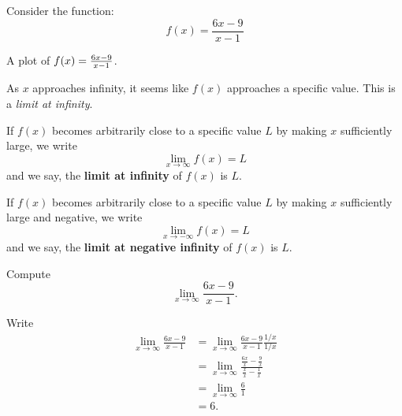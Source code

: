 Consider the function:
\[
f(x) = \frac{6x-9}{x-1}
\]
\begin{marginfigure}[0in]
\caption{A plot of $f(x)=\protect\frac{6x-9}{x-1}$.}
\label{plot:(x^2-9x+14)/(x^2-5x+6)}
\end{marginfigure}
As $x$ approaches infinity, it seems like $f(x)$ approaches a specific
value. This is a \textit{limit at infinity}.

\begin{definition}\label{def:limitAtInfty}
If $f(x)$ becomes arbitrarily close to a specific value $L$ by making
$x$ sufficiently large, we write
\[
\lim_{x\to \infty} f(x) = L
\]
and we say, the \textbf{limit at infinity} of $f(x)$ is $L$.  

If $f(x)$ becomes
arbitrarily close to a specific value $L$ by making $x$ sufficiently
large and negative, we write
\[
\lim_{x\to -\infty} f(x) = L
\]
and we say, the \textbf{limit at negative infinity} of $f(x)$ is $L$.  
\end{definition}

\begin{example} Compute
\[
\lim_{x\to\infty} \frac{6x-9}{x-1}.
\]
\end{example}


\begin{solution}
Write
\begin{align*}
\lim_{x\to\infty}\frac{6x-9}{x-1} &= \lim_{x\to\infty}\frac{6x-9}{x-1} \frac{1/x}{1/x}\\
&=\lim_{x\to\infty}\frac{\frac{6x}{x} - \frac{9}{x}}{\frac{x}{x} - \frac{1}{x}}\\
&= \lim_{x\to\infty} \frac{6}{1}\\
&= 6.
\end{align*}
\end{solution}



